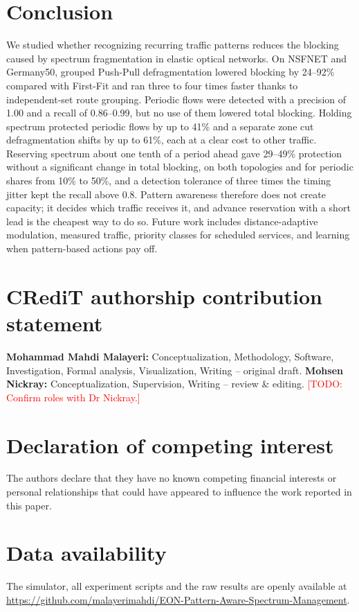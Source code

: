 \documentclass[preprint,12pt]{elsarticle}
\newcommand{\todo}[1]{\textcolor{red}{[TODO: #1]}}
\begin{document}
\section{Conclusion}\label{sec:conclusion}
We studied whether recognizing recurring traffic patterns reduces the blocking caused by spectrum fragmentation in elastic optical networks. On NSFNET and Germany50, grouped Push-Pull defragmentation lowered blocking by 24--92\% compared with First-Fit and ran three to four times faster thanks to independent-set route grouping. Periodic flows were detected with a precision of 1.00 and a recall of 0.86--0.99, but no use of them lowered total blocking. Holding spectrum protected periodic flows by up to 41\% and a separate zone cut defragmentation shifts by up to 61\%, each at a clear cost to other traffic. Reserving spectrum about one tenth of a period ahead gave 29--49\% protection without a significant change in total blocking, on both topologies and for periodic shares from 10\% to 50\%, and a detection tolerance of three times the timing jitter kept the recall above 0.8. Pattern awareness therefore does not create capacity; it decides which traffic receives it, and advance reservation with a short lead is the cheapest way to do so. Future work includes distance-adaptive modulation, measured traffic, priority classes for scheduled services, and learning when pattern-based actions pay off.

\section*{CRediT authorship contribution statement}
\textbf{Mohammad Mahdi Malayeri:} Conceptualization, Methodology, Software, Investigation, Formal analysis, Visualization, Writing -- original draft. \textbf{Mohsen Nickray:} Conceptualization, Supervision, Writing -- review \& editing. \todo{Confirm roles with Dr Nickray.}

\section*{Declaration of competing interest}
The authors declare that they have no known competing financial interests or personal relationships that could have appeared to influence the work reported in this paper.

\section*{Data availability}
The simulator, all experiment scripts and the raw results are openly available at \url{https://github.com/malayerimahdi/EON-Pattern-Aware-Spectrum-Management}.
\end{document}
